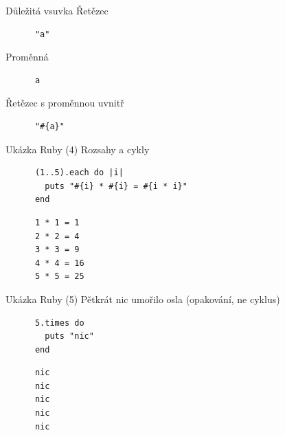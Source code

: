 \documentclass{beamer}
\begin{document}
\begin{frame}[fragile]{Důležitá vsuvka}
  Řetězec
  \begin{block}{}
    \smallskip \footnotesize
    {\scriptsize \begin{verbatim}
      "a"
    \end{verbatim}}
  \end{block}
  \pause
  Proměnná
  \begin{block}{}
    \smallskip \footnotesize
    {\scriptsize \begin{verbatim}
      a
    \end{verbatim}}
  \end{block}
  \pause
  Řetězec s proměnnou uvnitř
  \begin{block}{}
    \smallskip \footnotesize
    {\scriptsize \begin{verbatim}
      "#{a}"
    \end{verbatim}}
  \end{block}
\end{frame}

\begin{frame}[fragile]{Ukázka Ruby (4)}
  Rozsahy a cykly
  \begin{block}{}
    \smallskip \footnotesize
    {\scriptsize \begin{verbatim}
      (1..5).each do |i|
        puts "#{i} * #{i} = #{i * i}"
      end
    \end{verbatim}}
  \end{block}
  \pause
  \begin{block}{}
    \smallskip \footnotesize
    {\scriptsize \begin{verbatim}
      1 * 1 = 1
      2 * 2 = 4
      3 * 3 = 9
      4 * 4 = 16
      5 * 5 = 25
    \end{verbatim}}
  \end{block}
\end{frame}


\begin{frame}[fragile]{Ukázka Ruby (5)}
  Pětkrát nic umořilo osla (opakování, ne cyklus)
  \begin{block}{}
    \smallskip \footnotesize
    {\scriptsize \begin{verbatim}
      5.times do
        puts "nic"
      end
    \end{verbatim}}
  \end{block}
  \pause
  \begin{block}{}
    \smallskip \footnotesize
    {\scriptsize \begin{verbatim}
      nic
      nic
      nic
      nic
      nic
    \end{verbatim}}
  \end{block}
\end{frame}
\end{document}
